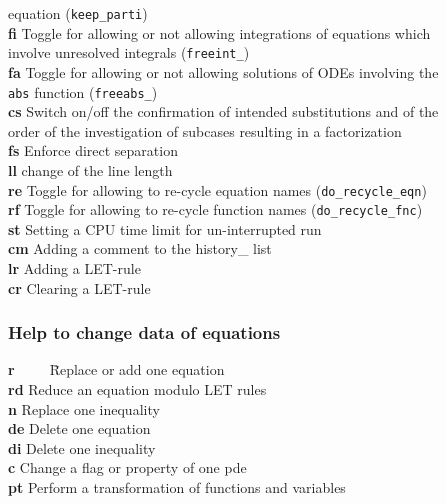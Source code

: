 \documentclass[12pt]{article}
\begin{document}
\begin{tabbing}
                        equation ({\tt keep\_parti}) \\
  {\bf fi}   \> Toggle for allowing or not allowing
                        integrations of equations which \\
             \> involve unresolved integrals ({\tt freeint\_})  \\
  {\bf fa}   \> Toggle for allowing or not allowing solutions of ODEs
                        involving the \\
             \> {\tt abs} function ({\tt freeabs\_})  \\
  {\bf cs}   \> Switch on/off the confirmation of intended substitutions
                and of the \\
             \> order of the investigation of subcases 
                resulting in a factorization \\
  {\bf fs}   \> Enforce direct separation \\
  {\bf ll}   \> change of the line length \\
  {\bf re}   \> Toggle for allowing to re-cycle equation names
             ({\tt do\_recycle\_eqn})  \\
  {\bf rf}   \> Toggle for allowing to re-cycle function names
             ({\tt do\_recycle\_fnc}) \\
  {\bf st}   \> Setting a CPU time limit for un-interrupted run \\
  {\bf cm}   \> Adding a comment to the history\_ list \\
  {\bf lr}   \> Adding a LET-rule \\
  {\bf cr}   \> Clearing a LET-rule
\end{tabbing}

\subsubsection{Help to change data of equations} 
\begin{tabbing}
  {\bf r}\ \ \ \ \ \= Replace or add one equation \\
  {\bf rd}   \> Reduce an equation modulo LET rules \\
  {\bf n}    \> Replace one inequality      \\
  {\bf de}   \> Delete one equation         \\             
  {\bf di}   \> Delete one inequality       \\
  {\bf c}    \> Change a flag or property of one pde  \\
  {\bf pt}   \> Perform a transformation of functions and variables
\end{tabbing}
\end{document}

